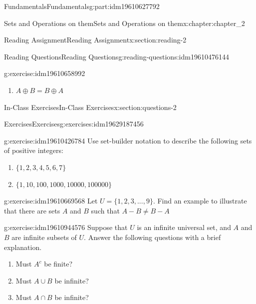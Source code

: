 \documentclass[oneside,10pt,]{book}
\numberwithin{equation}{section}
\begin{document}
\begin{partptx}{Fundamentals}{}{Fundamentals}{}{}{g:part:idm19610627792}
\begin{chapterptx}{Sets and Operations on them}{}{Sets and Operations on them}{}{}{x:chapter:chapter_2}
\begin{sectionptx}{Reading Assignment}{}{Reading Assignment}{}{}{x:section:reading-2}
\begin{reading-questions-subsection-numberless}{Reading Questions}{}{Reading Questions}{}{}{g:reading-questions:idm19610476144}
\begin{divisionexercise}{3}{}{}{g:exercise:idm19610658992}
\begin{multicols}{2}
\begin{enumerate}[label=(\alph*)]
\item{}\(\displaystyle A \oplus  B = B \oplus  A\)%
\end{enumerate}
\end{multicols}
%
\end{divisionexercise}%
\end{reading-questions-subsection-numberless}
\end{sectionptx}
%
%
\typeout{************************************************}
\typeout{************************************************}
%
\begin{sectionptx}{In-Class Exercises}{}{In-Class Exercises}{}{}{x:section:questions-2}
%
%
%
\typeout{************************************************}
\typeout{************************************************}
%
\begin{exercises-subsection-numberless}{Exercises}{}{Exercises}{}{}{g:exercises:idm19629187456}
\par\medskip\noindent%
%
\begin{exercisegroup}
\begin{divisionexerciseeg}{1}{}{}{g:exercise:idm19610426784}%
Use set-builder notation to describe the following sets of positive integers:%
\begin{enumerate}[label=(\alph*)]
\item{}\(\displaystyle \{1, 2, 3, 4, 5, 6, 7\}\)%
\item{}\(\displaystyle \{1, 10, 100, 1000, 10000, 100000\}\)%
\end{enumerate}
%
\end{divisionexerciseeg}%
\begin{divisionexerciseeg}{2}{}{}{g:exercise:idm19610669568}%
Let \(U= \{1, 2, 3, . . . , 9\}\). Find an example to illustrate that there are sets \(A\) and \(B\) such that \(A - B \neq  B - A\)%
\end{divisionexerciseeg}%
\begin{divisionexerciseeg}{3}{}{}{g:exercise:idm19610944576}%
Suppose that \(U\) is an infinite universal set, and \(A\) and \(B\) are infinite subsets of \(U\). Answer the following questions with a brief explanation.%
\par
%
\begin{enumerate}[label=(\alph*)]
\item{}Must \(A^c\) be finite?%
\item{}Must \(A\cup B\) be infinite?%
\item{}Must \(A\cap B\) be infinite?%

\end{enumerate}
\end{divisionexerciseeg}
\end{exercisegroup}
\end{exercises-subsection-numberless}
\end{sectionptx}
\end{chapterptx}
\end{partptx}
\end{document}
